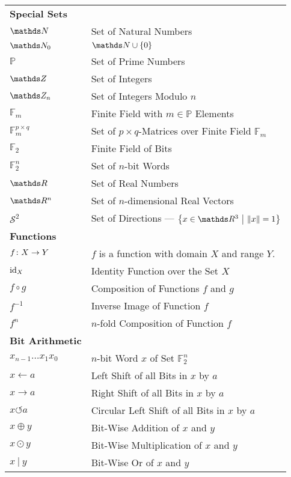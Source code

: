\documentclass[crop=false,10pt,ngerman]{standalone}
\begin{document}
{\begin{tabularx}{\textwidth}{p{}p{}}
      \textbf{Special Sets} & \\
      $\setNatural$ & Set of Natural Numbers \\
      $\setNatural_0$ & $\setNatural \cup \set{0}{}$ \\
      $\mathds{P}$ & Set of Prime Numbers \\
      $\setInteger$ & Set of Integers \\
      $\setInteger_n$ & Set of Integers Modulo $n$ \\
      $\mathds{F}_m$ & Finite Field with $m\in\mathds{P}$ Elements \\
      $\mathds{F}^{p\times q}_m$ & Set of $p\times q$-Matrices over Finite Field $\mathds{F}_m$ \\
      $\mathds{F}_2$ & Finite Field of Bits \\
      $\mathds{F}_2^n$ & Set of $n$-bit Words \\
      $\setReal$ & Set of Real Numbers \\
      $\setReal^n$ & Set of $n$-dimensional Real Vectors \\
      $\mathscr{S}^2$ & Set of Directions --- $\set{x\in\setReal^3}{\norm{x} = 1}$ \\

      \hline

      \textbf{Functions} & \\
      $f\colon X\to Y$ & $f$ is a function with domain $X$ and range $Y$. \\
      $\mathrm{id}_X$ & Identity Function over the Set $X$ \\
      $f\circ g$ & Composition of Functions $f$ and $g$ \\
      $f^{-1}$ & Inverse Image of Function $f$ \\
      $f^n$ & $n$-fold Composition of Function $f$ \\


      \hline

      \textbf{Bit Arithmetic} & \\
      $x_{n-1}\ldots x_{1}x_{0}$ & $n$-bit Word $x$ of Set $\mathds{F}_2^n$ \\
      $x \leftarrow a$ & Left Shift of all Bits in $x$ by $a$ \\
      $x \rightarrow a$ & Right Shift of all Bits in $x$ by $a$ \\
      $x \circlearrowleft a$ & Circular Left Shift of all Bits in $x$ by $a$ \\
      $x \oplus y$ & Bit-Wise Addition of $x$ and $y$ \\
      $x \odot y$ & Bit-Wise Multiplication of $x$ and $y$ \\
      $x \ | \ y$ & Bit-Wise Or of $x$ and $y$ \\



\end{tabularx}}
\end{document}
